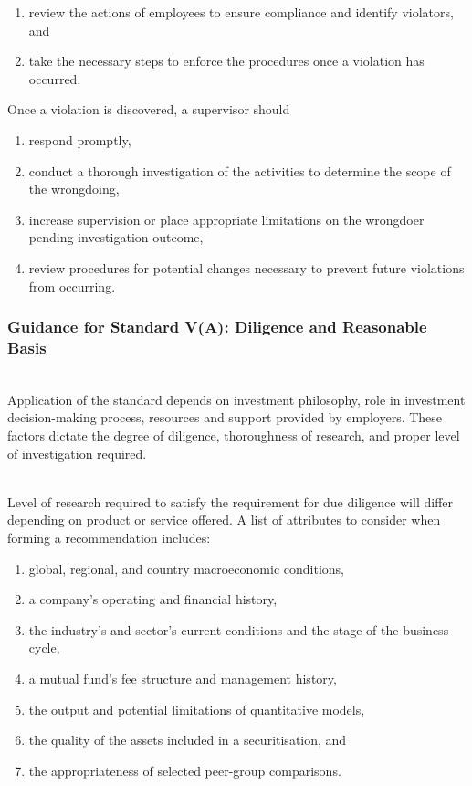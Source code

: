 \begin{remark}
\begin{enumerate}[label=\roman*.]
\item review the actions of employees to ensure compliance and identify violators, and
\item take the necessary steps to enforce the procedures once a violation has occurred.
\end{enumerate}
Once a violation is discovered, a supervisor should
\begin{enumerate}[label=\roman*.]
\setlength{\itemsep}{0pt}
\item respond promptly,
\item conduct a thorough investigation of the activities to determine the scope of the wrongdoing,
\item increase supervision or place appropriate limitations on the wrongdoer pending investigation outcome,
\item review procedures for potential changes necessary to prevent future violations from occurring.
\end{enumerate}
\end{remark}

\subsubsection{Guidance for Standard V(A): Diligence and Reasonable Basis}

\begin{remark} \\
Application of the standard depends on investment philosophy, role in investment decision-making process, resources and support provided by employers. These factors dictate the degree of diligence, thoroughness of research, and proper level of investigation required.
\end{remark}

\begin{remark} \\
Level of research required to satisfy the requirement for due diligence will differ depending on product or service offered. A list of attributes to consider when forming a recommendation includes:
\begin{enumerate}[label=\roman*.]
\setlength{\itemsep}{0pt}
\item global, regional, and country macroeconomic conditions,
\item a company’s operating and financial history,
\item the industry’s and sector’s current conditions and the stage of the business cycle,
\item a mutual fund’s fee structure and management history,
\item the output and potential limitations of quantitative models,
\item the quality of the assets included in a securitisation, and
\item the appropriateness of selected peer-group comparisons.
\end{enumerate}
\end{remark}

